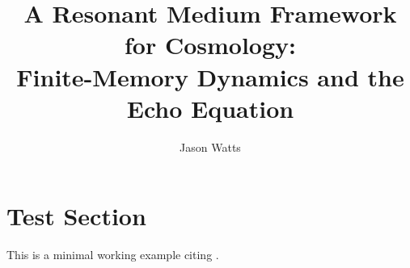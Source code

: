 \documentclass[a4paper,11pt]{article}
\title{A Resonant Medium Framework for Cosmology:\\ Finite-Memory Dynamics and the Echo Equation}
\author{Jason Watts}
\affiliation{Independent Researcher}
\begin{document}
\maketitle

\section{Test Section}
This is a minimal working example citing \cite{Planck2018, PantheonPlus2022, DESI2024_BAO_DR1, Watts2025_EchoEvidence}.

\clearpage


\end{document}
